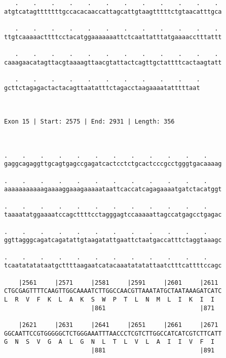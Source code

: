 \documentclass{article}
\begin{document}
\begin{Verbatim}
   .    .    .    .    .    .    .    .    .    .    .    . 
atgtcatagtttttttgccacacaaccattagcattgtaagtttttctgtaacatttgca
                                                            
   .    .    .    .    .    .    .    .    .    .    .    . 
ttgtcaaaaacttttcctacatggaaaaaaattctcaattatttatgaaaacctttattt
                                                            
   .    .    .    .    .    .    .    .    .    .    .    . 
caaagaacatagttacgtaaaagttaacgtattactcagttgctattttcactaagtatt
                                                            
   .    .    .    .    .    .    .    .    .    .    .
gcttctagagactactacagttaatatttctagacctaagaaaatatttttaat
                                                      
                                                      
 
Exon 15 | Start: 2575 | End: 2931 | Length: 356



.    .    .    .    .    .    .    .    .    .    .    .    
gaggcagaggttgcagtgagccgagatcactcctctgcactcccgcctgggtgacaaaag
                                                            
.    .    .    .    .    .    .    .    .    .    .    .    
aaaaaaaaaaagaaaaggaaagaaaaataattcaccatcagagaaaatgatctacatggt
                                                            
.    .    .    .    .    .    .    .    .    .    .    .    
taaaatatggaaaatccagcttttcctagggagtccaaaaattagccatgagcctgagac
                                                            
.    .    .    .    .    .    .    .    .    .    .    .    
ggttagggcagatcagatattgtaagatattgaattctaatgaccatttctaggtaaagc
                                                            
.    .    .    .    .    .    .    .    .    .    .    .    
tcaatatatataatgcttttaagaatcatacaaatatatattaatctttcattttccagc
                                                            
    |2561     |2571     |2581     |2591     |2601     |2611 
CTGCGAGTTTTCAAGTTGGCAAAATCTTGGCCAACGTTAAATATGCTAATAAAGATCATC
L  R  V  F  K  L  A  K  S  W  P  T  L  N  M  L  I  K  I  I  
                        |861                          |871  
  
    |2621     |2631     |2641     |2651     |2661     |2671 
GGCAATTCCGTGGGGGCTCTGGGAAATTTAACCCTCGTCTTGGCCATCATCGTCTTCATT
G  N  S  V  G  A  L  G  N  L  T  L  V  L  A  I  I  V  F  I  
                        |881                          |891  
  

\end{Verbatim}
\end{document}
